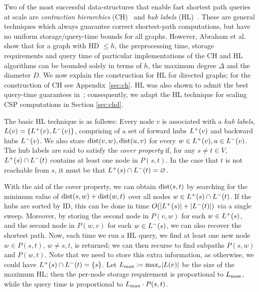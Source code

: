 Two of the most successful data-structures that enable fast shortest path queries at scale are \emph{contraction hierarchies} (CH)~\cite{geisberger_ch_definition} and \emph{hub labels} (HL)~\cite{cohen_definition_hl}.
These are general techniques which always guarantee correct shortest-path computations, but have no uniform storage/query-time bounds for all graphs.
However, Abraham et al.~\cite{highway2013} show that for a graph with HD $\leq h$, the preprocessing time, storage requirements and query time of particular implementations of the CH and HL algorithms can be bounded solely in terms of $h$, the maximum degree $\Delta$ and the diameter $D$. 
We now explain the construction for HL for directed graphs; for the construction of CH see Appendix~\ref{sec:ch}.
HL was also shown to admit the best query-time guarantees in~\cite{highway2013}; consequently, we adapt the HL technique for scaling CSP computations in Section \ref{sec:chd}.

The basic HL technique is as follows:
Every node $v$ is associated with a \emph{hub labels}, $L(v) = \crl*{\Lf(v),\Lb(v)}$, comprising of a set of forward hubs $\Lf(v)$ and backward hubs $\Lb(v)$.
We also store $\dist(v,w),\dist(u,v)$ for every $w\in\Lf(v),u\in\Lb(v)$.
The hub labels are said to satisfy the \emph{cover property} if, for any $s\neq t\in V$, $\Lf(s)\cap\Lb(t)$ contains at least one node in $P(s,t)$.
In the case that $t$ is not reachable from $s$, it must be that $\Lf(s)\cap\Lb(t)=\varnothing$.

With the aid of the cover property, we can obtain $\dist(s,t)$ by searching for the minimum value of $\dist(s,w)+\dist(w,t)$ over all nodes $w\in\Lf(s)\cap\Lb(t)$.
If the hubs are sorted by ID, this can be done in time $\Or(\card{\Lf(s)}+\card{\Lb(t)})$ via a single sweep.
Moreover, by storing the second node in $P(v,w)$ for each $w\in \Lf(s)$, and the second node in $P(w,v)$ for each $w\in \Lb(s)$, we can also recover the shortest path.
Now, each time we run a HL query, we find at least one new node $w\in P(s,t)$, $w\neq s,t$, is returned; we can then recurse to find subpaths $P(s,w)$ and $P(w,t)$.
Note that we need to store this extra information, as otherwise, we could have $\Lf(s)\cap\Lb(t)=\{s\}$.
Let $\Lm \defeq \max_v\abs*{L(v)}$ be the size of the maximum HL; then the per-node storage requirement is proportional to $\Lm$, while the query time is proportional to $\Lm\cdot P(s,t)$.

